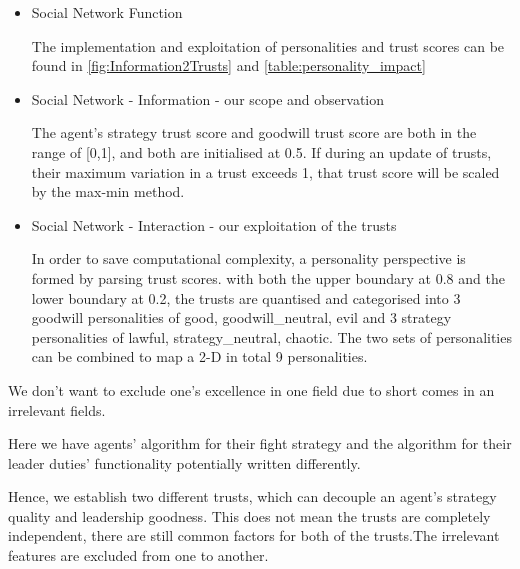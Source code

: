 \begin{itemize}
\item Social Network Function
            \begin{flushleft}
            \setlength{\parindent}{2em}
            The implementation and exploitation of personalities and trust scores can be found in \ref{fig:Information2Trusts} and \ref{table:personality_impact}
            \end{flushleft}

\item Social Network - Information - our scope and observation
            \begin{flushleft}
            \setlength{\parindent}{2em}

The agent's strategy trust score and goodwill trust score are both in the range of [0,1], and both are initialised at 0.5. If during an update of trusts, their maximum variation in a trust exceeds 1, that trust score will be scaled by the max-min method.
            \end{flushleft}
\item Social Network - Interaction - our exploitation of the trusts
        \begin{flushleft}
        \setlength{\parindent}{2em}
        In order to save computational complexity, a personality perspective is formed by parsing trust scores. with both the upper boundary at 0.8 and the lower boundary at 0.2, the trusts are quantised and categorised into 3 goodwill personalities of {good, goodwill\_neutral, evil} and 3 strategy personalities of {lawful, strategy\_neutral, chaotic}. The two sets of personalities can be combined to map a 2-D in total 9 personalities. 
        \end{flushleft}

\end{itemize}










We don't want to exclude one's excellence in one field due to short comes in an irrelevant fields.

Here we have agents' algorithm for their fight strategy and the algorithm for their leader duties' functionality potentially written differently.

Hence, we establish two different trusts, which can decouple an agent's strategy quality and leadership goodness. This does not mean the trusts are completely independent, there are still common factors for both of the trusts.The irrelevant features are excluded from one to another.

